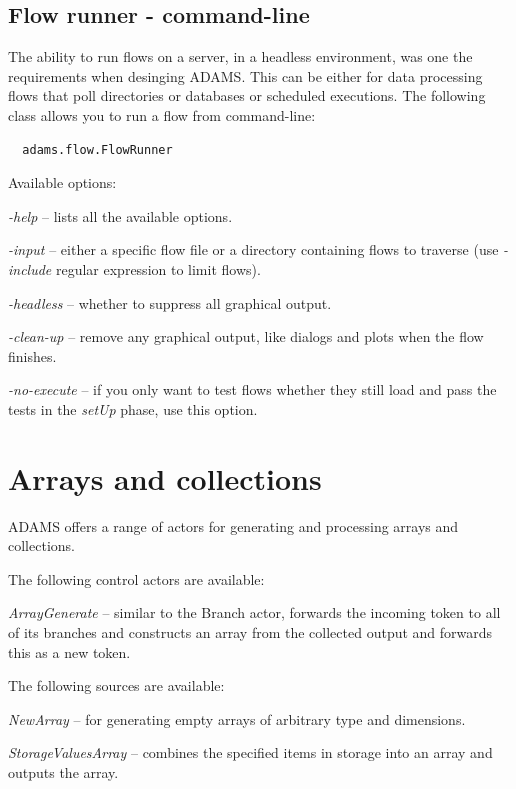 \subsection{Flow runner - command-line}
The ability to run flows on a server, in a headless environment, was one the
requirements when desinging ADAMS. This can be either for data processing
flows that poll directories or databases or scheduled executions. The following
class allows you to run a flow from command-line:
\begin{verbatim}
  adams.flow.FlowRunner
\end{verbatim}
Available options:
\begin{tight_itemize}
	\item \textit{-help} -- lists all the available options.
	\item \textit{-input} -- either a specific flow file or a directory containing
	flows to traverse (use \textit{-include} regular expression to limit flows).
	\item \textit{-headless} -- whether to suppress all graphical output.
	\item \textit{-clean-up} -- remove any graphical output, like dialogs and
	plots when the flow finishes.
	\item \textit{-no-execute} -- if you only want to test flows whether they 
	still load and pass the tests in the \textit{setUp} phase, use this option.
\end{tight_itemize}

\newpage
\section{Arrays and collections}
\label{arrays_and_collections}
ADAMS offers a range of actors for generating and processing arrays and
collections.

\noindent The following control actors are available:
\begin{tight_itemize}
	\item \textit{ArrayGenerate} -- similar to the Branch actor, forwards
	the incoming token to all of its branches and constructs an array from
	the collected output and forwards this as a new token.
\end{tight_itemize}

\noindent The following sources are available:
\begin{tight_itemize}
	\item \textit{NewArray} -- for generating empty arrays of arbitrary type 
	and dimensions.
	\item \textit{StorageValuesArray} -- combines the specified items in 
	storage into an array and outputs the array.
\end{tight_itemize}

